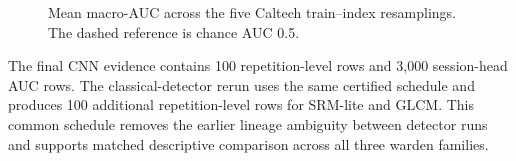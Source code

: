\begin{figure}[!htbp]
\centering
{}
\caption{Mean macro-AUC across the five Caltech train--index resamplings. The dashed reference is chance AUC 0.5.}
\label{fig:detectors}
\end{figure}

The final CNN evidence contains 100 repetition-level rows and 3,000 session-head AUC rows. The classical-detector rerun uses the same certified schedule and produces 100 additional repetition-level rows for SRM-lite and GLCM. This common schedule removes the earlier lineage ambiguity between detector runs and supports matched descriptive comparison across all three warden families.
